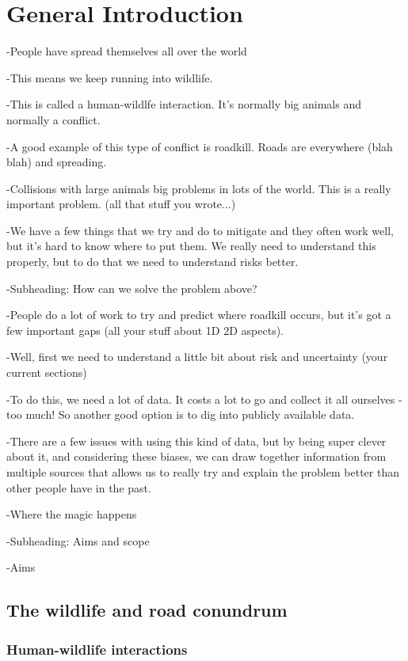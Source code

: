 \chapter{General Introduction}\label{sec:intro}
\newpage

-People have spread themselves all over the world

-This means we keep running into wildlife.

-This is called a human-wildlfe interaction. It’s normally big animals and normally a conflict.

-A good example of this type of conflict is roadkill. Roads are everywhere (blah blah) and spreading.

-Collisions with large animals big problems in lots of the world. This is a really important problem. (all that stuff you wrote...)

-We have a few things that we try and do to mitigate and they often work well, but it’s hard to know where to put them. We really need to understand this properly, but to do that we need to understand risks better.

-Subheading: How can we solve the problem above?

-People do a lot of work to try and predict where roadkill occurs, but it’s got a few important gaps (all your stuff about 1D 2D aspects).

-Well, first we need to understand a little bit about risk and uncertainty (your current sections)

-To do this, we need a lot of data. It costs a lot to go and collect it all ourselves - too much! So another good option is to dig into publicly available data.

-There are a few issues with using this kind of data, but by being super clever about it, and considering these biases, we can draw together information from multiple sources that allows us to really try and explain the problem better than other people have in the past.

-Where the magic happens

-Subheading: Aims and scope

-Aims

\section{The wildlife and road conundrum}

\subsection{Human-wildlife interactions}

